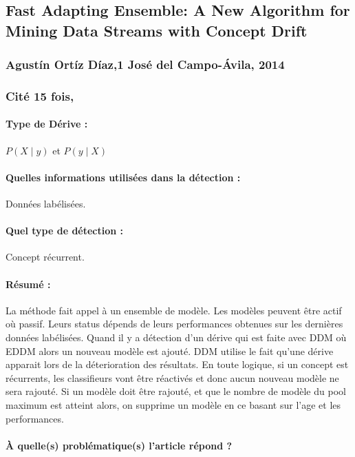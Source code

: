 \documentclass[11pt,a4paper]{report}
\begin{document}
\subsection{Fast Adapting Ensemble: A New Algorithm for Mining Data Streams with Concept Drift}
\subsubsection{Agustín Ortíz Díaz,1 José del Campo-Ávila,  2014}

\subsubsection{Cité 15 fois, }

\paragraph{Type de Dérive :} $P(X\mid y)$ et $P(y \mid X)$ 
\paragraph{Quelles informations utilisées dans la détection :} Données labélisées.
\paragraph{Quel type de détection :} Concept récurrent.

\paragraph{Résumé :} La méthode fait appel à un ensemble de modèle. Les modèles peuvent être actif où passif. Leurs status dépends de leurs performances obtenues sur les dernières données labélisées. Quand il y a détection d'un dérive qui est faite avec DDM où EDDM alors un nouveau modèle est ajouté. DDM utilise le fait qu'une dérive apparait lors de la déterioration des résultats. En toute logique, si un concept est récurrents, les classifieurs vont être réactivés et donc aucun nouveau modèle ne sera rajouté. Si un modèle doit être rajouté, et que le nombre de modèle du pool maximum est atteint alors, on supprime un modèle en ce basant sur l'age et les performances.

\paragraph{À quelle(s) problématique(s) l'article répond ?} 
\end{document}
